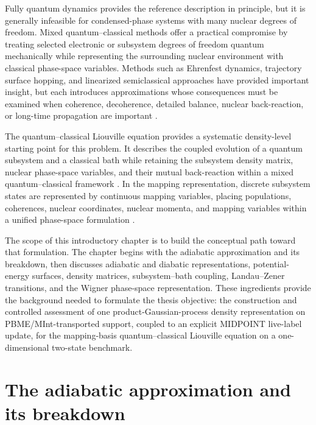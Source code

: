 \documentclass[
  11pt,
  letterpaper,
  onehalfspacing,
  normalmargins,
  equalmargins,
  oneside
]{ut-thesis}
\begin{document}
Fully quantum dynamics provides the reference description in principle, but it
is generally infeasible for condensed-phase systems with many nuclear degrees
of freedom. Mixed quantum--classical methods offer a practical compromise by
treating selected electronic or subsystem degrees of freedom quantum
mechanically while representing the surrounding nuclear environment with
classical phase-space variables. Methods such as Ehrenfest dynamics,
trajectory surface hopping, and linearized semiclassical approaches have
provided important insight, but each introduces approximations whose
consequences must be examined when coherence, decoherence, detailed balance,
nuclear back-reaction, or long-time propagation are important
\cite{Tully1990JCP,Kapral2006ARPC,Curchod2018ChemRev}.

The quantum--classical Liouville equation provides a systematic density-level
starting point for this problem. It describes the coupled evolution of a
quantum subsystem and a classical bath while retaining the subsystem density
matrix, nuclear phase-space variables, and their mutual back-reaction within a
mixed quantum--classical framework
\cite{KapralCiccotti1999JCP,Kapral2006ARPC}. In the mapping representation,
discrete subsystem states are represented by continuous mapping variables,
placing populations, coherences, nuclear coordinates, nuclear momenta, and
mapping variables within a unified phase-space formulation
\cite{MeyerMiller1979JCP,StockThoss1997PRL,Kim2008JCP}.

The scope of this introductory chapter is to build the conceptual path toward
that formulation. The chapter begins with the adiabatic approximation and its
breakdown, then discusses adiabatic and diabatic representations,
potential-energy surfaces, density matrices, subsystem--bath coupling,
Landau--Zener transitions, and the Wigner phase-space representation. These
ingredients provide the background needed to formulate the thesis objective:
the construction and controlled assessment of one product-Gaussian-process
density representation on PBME/MInt-transported support, coupled to an
explicit MIDPOINT live-label update, for the mapping-basis quantum--classical
Liouville equation on a one-dimensional two-state benchmark.


\section{The adiabatic approximation and its breakdown}
\label{sec:adiabatic-approximation-breakdown}
\end{document}
